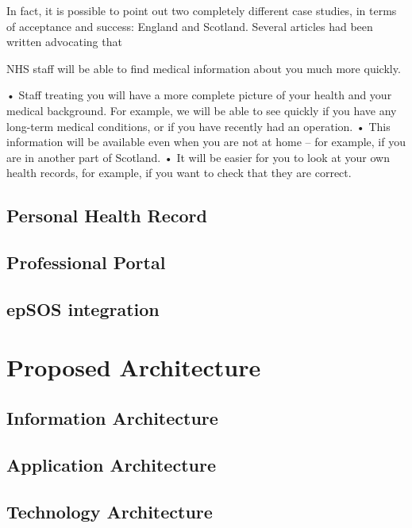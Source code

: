 In fact, it is possible to point out two completely different case studies, in terms of acceptance and success: England and Scotland. Several articles had been written advocating that 



NHS staff will be able to find medical information about you much more quickly.

• Staff treating you will have a more complete picture of your health and your medical background. For example, we will be able to see quickly if you have any long-term medical conditions, or if you have recently had an operation.
• This information will be available even when you are not at home – for example, if you are in another part of Scotland.
• It will be easier for you to look at your own health records, for example, if you want to check that they are correct.



\subsection{Personal Health Record}

\subsection{Professional Portal}
\subsection{epSOS integration}

\section{Proposed Architecture}
\subsection{Information Architecture}
\subsection{Application Architecture}
\subsection{Technology Architecture}


